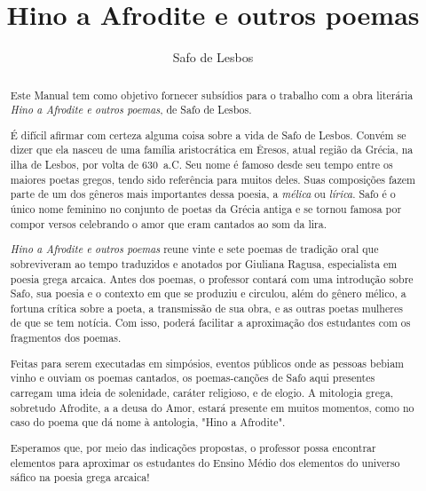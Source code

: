 \documentclass[12pt]{extarticle}
\begin{document}

\newcommand{\AutorLivro}{Safo de Lesbos}
\newcommand{\TituloLivro}{Hino a Afrodite e outros poemas}
\newcommand{\Tema}{Ficção, mistério e fantasia}
\newcommand{\Genero}{Poema}
\newcommand{\imagemCapa}{./images/PNLD0035-01.png}
\newcommand{\issnppub}{---}
\newcommand{\issnepub}{---}
\newcommand{\colaborador}{\textbf{Fulano de Tal} é uma pessoa incrível e vai fazer um bom serviço.}


\title{\TituloLivro}
\author{\AutorLivro}
\def\authornotes{\colaborador}

\date{}
\maketitle

\begin{abstract}
Este Manual tem como objetivo fornecer subsídios para o trabalho com a
obra literária \emph{Hino a Afrodite e outros poemas}, de Safo de Lesbos.

É difícil afirmar com certeza alguma coisa sobre a vida de Safo de Lesbos.
Convém se dizer que ela nasceu de uma família aristocrática em Êresos, atual região da
Grécia, na ilha de Lesbos, por volta de 630~a.C. Seu nome é famoso desde seu tempo entre 
os maiores poetas gregos, tendo sido referência para muitos deles. Suas composições fazem
parte de um dos gêneros mais importantes dessa poesia, a \textit{mélica} ou \textit{lírica}.
Safo é o único nome feminino no conjunto de poetas da Grécia antiga e se tornou famosa por 
compor versos celebrando o amor que eram cantados ao som da lira.

\emph{Hino a Afrodite e outros poemas} reune vinte e sete poemas de tradição oral
que sobreviveram ao tempo traduzidos e anotados por Giuliana Ragusa, especialista em 
poesia grega arcaica. Antes dos poemas, o professor contará com uma introdução sobre Safo, 
sua poesia e o contexto em que se produziu e circulou, além do gênero mélico, a fortuna 
crítica sobre a poeta, a transmissão de sua obra, e as outras poetas mulheres de que se 
tem notícia. Com isso, poderá facilitar a aproximação dos estudantes com os fragmentos 
dos poemas.

Feitas para serem executadas em simpósios, eventos públicos onde as pessoas bebiam vinho
e ouviam os poemas cantados, os poemas-canções de Safo aqui presentes carregam uma ideia 
de solenidade, caráter religioso, e de elogio. A mitologia grega, sobretudo Afrodite, a 
a deusa do Amor, estará presente em muitos momentos, como no caso do poema que dá nome 
à antologia, "Hino a Afrodite". 

Esperamos que, por meio das indicações propostas, o professor possa encontrar elementos 
para aproximar os estudantes do Ensino Médio dos elementos do universo sáfico na poesia grega arcaica!

\end{abstract}
\end{document}
